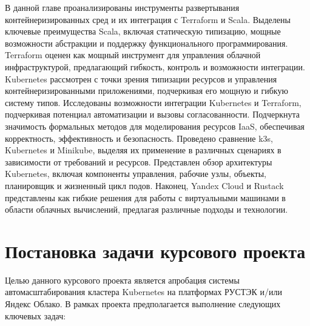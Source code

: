 В данной главе проанализированы инструменты развертывания контейнеризированных
сред и их интеграция с Terraform и Scala. Выделены ключевые преимущества Scala,
включая статическую типизацию, мощные возможности абстракции и поддержку функционального 
программирования. Terraform оценен как мощный инструмент для управления облачной 
инфраструктурой, предлагающий гибкость, контроль и возможности интеграции. 
Kubernetes рассмотрен с точки зрения типизации ресурсов и управления
контейнеризированными приложениями, подчеркивая его мощную и гибкую систему типов. 
Исследованы возможности интеграции Kubernetes и Terraform, подчеркивая потенциал 
автоматизации и вызовы согласованности. Подчеркнута значимость формальных методов 
для моделирования ресурсов IaaS, обеспечивая корректность, эффективность и безопасность. 
Проведено сравнение k3s, Kubernetes и Minikube, выделяя их применение в различных 
сценариях в зависимости от требований и ресурсов. Представлен обзор архитектуры 
Kubernetes, включая компоненты управления, рабочие узлы, объекты, планировщик и 
жизненный цикл подов. Наконец, Yandex Cloud и Rustack представлены как гибкие
решения для работы с виртуальными машинами в области облачных вычислений, 
предлагая различные подходы и технологии.

\section{Постановка задачи курсового проекта}

Целью данного курсового проекта является апробация системы автомасштабирования
кластера Kubernetes на платформах РУСТЭК и/или Яндекс Облако. В рамках проекта
предполагается выполнение следующих ключевых задач:

